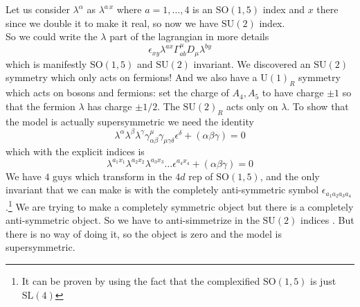 \documentclass[11pt]{article}
\theoremstyle{definition}
\numberwithin{equation}{section}
\newcommand*\U{\mathrm{U}}
\newcommand*\SU{\mathrm{SU}}
\newcommand*\SO{\mathrm{SO}}
\newcommand*\SL{\mathrm{SL}}
\begin{document}
Let us consider $\lambda^{\alpha}$ as $\lambda^{a\,x}$ where $a=1,\ldots,4$ is an $\SO(1,5)$ index and $x$ there since we double it to make it real, so now we have $\SU(2)$ index.\\
So we could write the $\lambda$ part of the lagrangian in more details
\begin{equation}
	\epsilon_{xy}\lambda^{ax}\Gamma_{ab}^{\mu}D_{\mu}\lambda^{by}
\end{equation}
which is manifestly $\SO(1,5)$ and $\SU(2)$ invariant. We discovered an $\SU(2)$ symmetry which only acts on fermions! And we also have a $\U(1)_{R}$ symmetry which acts on bosons and fermions: set the charge of $A_{4},A_{5}$ to have charge $\pm1$ so that the fermion $\lambda$ has charge $\pm 1/2$. The $\SU(2)_{R}$ acts only on $\lambda$. To show that the model is actually supersymmetric we need the identity
\begin{equation}
	\lambda^{\alpha}\lambda^{\beta}\lambda^{\gamma}\gamma^{\mu}_{\alpha\beta}\gamma_{\mu\gamma\delta}\epsilon^{\delta}+(\alpha\beta\gamma)=0
\end{equation}
which with the explicit indices is
\begin{equation}
	\lambda^{a_{1}x_{1}}\lambda^{a_{2}x_{2}}\lambda^{a_{3}x_{3}}\ldots\epsilon^{a_{4}x_{4}}+(\alpha\beta\gamma)=0
\end{equation}
We have $4$ guys which transform in the $4d$ rep of $\SO(1,5)$, and the only invariant that we can make is with the completely anti-symmetric symbol $\epsilon_{a_{1}a_{2}a_{3}a_{4}}$.\footnote{It can be proven by using the fact that the complexified $\SO(1,5)$ is just $\SL(4)$} We are trying to make a completely symmetric object but there is a completely anti-symmetric object. So we have to anti-simmetrize in the $\SU(2)$ indices . But there is no way of doing it, so the object is zero and the model is supersymmetric.
\end{document}
